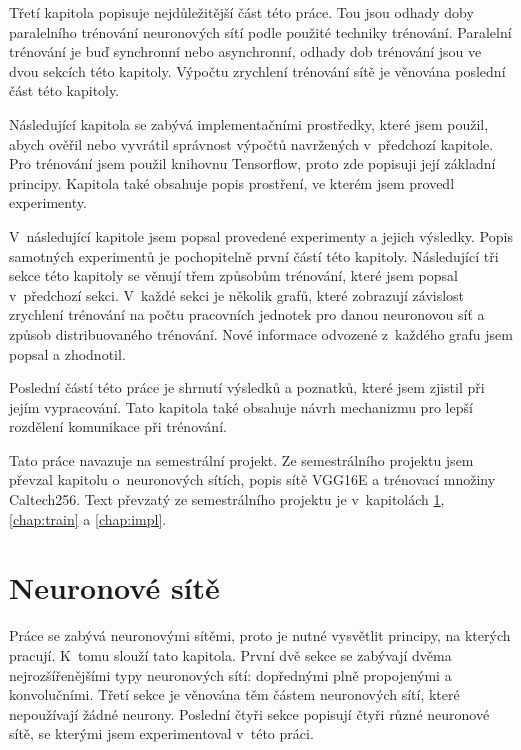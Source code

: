 Třetí kapitola popisuje nejdůležitější část této práce.
Tou jsou odhady doby paralelního trénování neuronových sítí podle použité techniky trénování. 
Paralelní trénování je buď synchronní nebo asynchronní, odhady dob trénování jsou ve dvou sekcích této kapitoly.
Výpočtu zrychlení trénování sítě je věnována poslední část této kapitoly.

Následující kapitola se zabývá implementačními prostředky, které jsem použil, abych ověřil nebo vyvrátil správnost výpočtů navržených v~předchozí kapitole.
Pro trénování jsem použil knihovnu Tensorflow, proto zde popisuji její základní principy.
Kapitola také obsahuje popis prostření, ve kterém jsem provedl experimenty.

V~následující kapitole jsem popsal provedené experimenty a jejich výsledky.
Popis samotných experimentů je pochopitelně první částí této kapitoly.
Následující tři sekce této kapitoly se věnují třem způsobům trénování, které jsem popsal v~předchozí sekci.
V~každé sekci je několik grafů, které zobrazují závislost zrychlení trénování na počtu pracovních jednotek pro danou neuronovou síť a způsob distribuovaného trénování.
Nové informace odvozené z~každého grafu jsem popsal a zhodnotil.

Poslední částí této práce je shrnutí výsledků a poznatků, které jsem zjistil při jejím vypracování. 
Tato kapitola také obsahuje návrh mechanizmu pro lepší rozdělení komunikace při trénování.

Tato práce navazuje na semestrální projekt.
Ze semestrálního projektu jsem převzal kapitolu o~neuronových sítích, popis sítě VGG16E a trénovací množiny Caltech256.
Text převzatý ze semestrálního projektu je v~kapitolách \ref{chap:nns}, \ref{chap:train} a \ref{chap:impl}.


\chapter{Neuronové sítě}
\label{chap:nns}

Práce se zabývá neuronovými sítěmi, proto je nutné vysvětlit principy, na kterých pracují.
K~tomu slouží tato kapitola.
První dvě sekce se zabývají dvěma nejrozšířenějšími typy neuronových sítí: dopřednými plně propojenými a konvolučními.
Třetí sekce je věnována těm částem neuronových sítí, které nepoužívají žádné neurony.
Poslední čtyři sekce popisují čtyři různé neuronové sítě, se kterými jsem experimentoval v~této práci.

